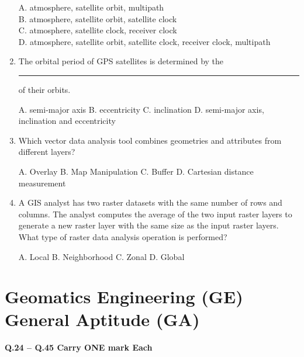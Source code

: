\documentclass[journal,12pt,onecolumn]{IEEEtran}
\begin{document}
\begin{enumerate}
    A. atmosphere, satellite orbit, multipath \\
    B. atmosphere, satellite orbit, satellite clock \\
    C. atmosphere, satellite clock, receiver clock \\
    D. atmosphere, satellite orbit, satellite clock, receiver clock, multipath

    \item The orbital period of GPS satellites is determined by the \rule{3cm}{0.15mm} of their orbits.

    A. semi-major axis \quad
    B. eccentricity \quad
    C. inclination \quad
    D. semi-major axis, inclination and eccentricity

    \item Which vector data analysis tool combines geometries and attributes from different layers?

    A. Overlay \quad
    B. Map Manipulation \quad
    C. Buffer \quad
    D. Cartesian distance measurement

    \item A GIS analyst has two raster datasets with the same number of rows and columns. The analyst computes the average of the two input raster layers to generate a new raster layer with the same size as the input raster layers. What type of raster data analysis operation is performed?

    A. Local \quad
    B. Neighborhood \quad
    C. Zonal \quad
    D. Global
\end{enumerate}

\section*{Geomatics Engineering (GE) \\ General Aptitude (GA)}

\textbf{Q.24 -- Q.45 Carry ONE mark Each}
\end{document}
